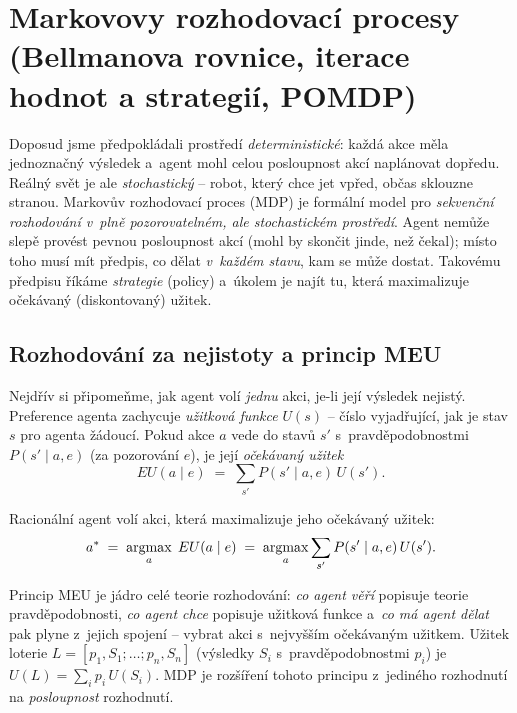 \section{Markovovy rozhodovací procesy (Bellmanova rovnice, iterace hodnot a strategií, POMDP)}

Doposud jsme předpokládali prostředí \emph{deterministické}: každá akce měla jednoznačný výsledek a~agent mohl celou posloupnost akcí naplánovat dopředu. Reálný svět je ale \emph{stochastický} -- robot, který chce jet vpřed, občas sklouzne stranou. Markovův rozhodovací proces (MDP) je formální model pro \emph{sekvenční rozhodování v~plně pozorovatelném, ale stochastickém prostředí}. Agent nemůže slepě provést pevnou posloupnost akcí (mohl by skončit jinde, než čekal); místo toho musí mít předpis, co dělat \emph{v~každém stavu}, kam se může dostat. Takovému předpisu říkáme \emph{strategie} (policy) a~úkolem je najít tu, která maximalizuje očekávaný (diskontovaný) užitek.

\subsection{Rozhodování za nejistoty a princip MEU}

Nejdřív si připomeňme, jak agent volí \emph{jednu} akci, je-li její výsledek nejistý. Preference agenta zachycuje \emph{užitková funkce} $U(s)$ -- číslo vyjadřující, jak je stav $s$ pro agenta žádoucí. Pokud akce $a$ vede do stavů $s'$ s~pravděpodobnostmi $P(s'\mid a, e)$ (za pozorování $e$), je její \emph{očekávaný užitek}
\[
  EU(a\mid e) \;=\; \sum_{s'} P(s'\mid a, e)\,U(s').
\]

\begin{definice}
Racionální agent volí akci, která maximalizuje jeho očekávaný užitek:
\[
  a^\ast \;=\; \operatorname*{argmax}_a \; EU(a\mid e) \;=\; \operatorname*{argmax}_a \sum_{s'} P(s'\mid a, e)\,U(s').
\]
\end{definice}

\begin{intuice}
Princip MEU je jádro celé teorie rozhodování: \emph{co agent věří} popisuje teorie pravděpodobnosti, \emph{co agent chce} popisuje užitková funkce a~\emph{co má agent dělat} pak plyne z~jejich spojení -- vybrat akci s~nejvyšším očekávaným užitkem. Užitek loterie $L=[p_1,S_1;\dots;p_n,S_n]$ (výsledky $S_i$ s~pravděpodobnostmi $p_i$) je $U(L)=\sum_i p_i\,U(S_i)$. MDP je rozšíření tohoto principu z~jediného rozhodnutí na \emph{posloupnost} rozhodnutí.
\end{intuice}

